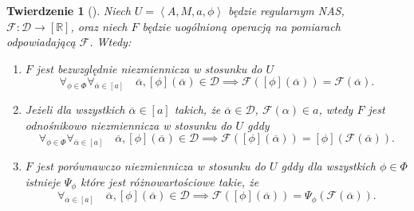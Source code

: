\documentclass[12pt,a4paper]{report}
\newtheorem{tw}[definition]{Twierdzenie}
\newcommand{\domkniecie}[1]{\left[ {#1} \right] }
\newcommand{\tuple}[1]{\left\langle {#1} \right\rangle}
\begin{document}
\begin{tw}[{\citep[Tw. 2]{adams1965theory}}]
Niech $U=\tuple{A,M,a,\phi}$ będzie regularnym NAS, $\mathcal{F}:\mathcal{D}\to \domkniecie{\mathbb{R}}$, oraz niech $F$ będzie uogólnioną operacją na pomiarach odpowiadającą $\mathcal{F}$. Wtedy:
\begin{enumerate}
\item
$F$ jest bezwzględnie niezmiennicza w stosunku do $U$ 
$$
\forall_{\phi \in \Phi} \forall_{\overline{\alpha} \in \domkniecie{a}} \quad \overline{\alpha}, \domkniecie{\phi}(\overline{\alpha}) \in \mathcal{D} \implies \mathcal{F}(\domkniecie{\phi}(\overline{\alpha}))=\mathcal{F}(\overline{\alpha}).
$$
\item
Jeżeli dla wszystkich $\overline{\alpha} \in \domkniecie{a}$ takich, że $\overline{\alpha} \in \mathcal{D}$, $\mathcal{F}(\alpha)\in a$, wtedy $F$ jest odnośnikowo niezmiennicza w stosunku do $U$ gddy
\begin{equation*}
\forall_{\phi \in \Phi} \forall_{\overline{\alpha} \in \domkniecie{a}} \quad \overline{\alpha}, \domkniecie{\phi}(\overline{\alpha}) \in \mathcal{D} \implies \mathcal{F}(\domkniecie{\phi}(\overline{\alpha}))=\domkniecie{\phi}(\mathcal{F}(\overline{\alpha})).
\end{equation*}
\item
$F$ jest porównawczo niezmiennicza w stosunku do $U$ gddy dla wszystkich $\phi \in \Phi$ istnieje $\Psi_{\phi}$ które jest różnowartościowe takie, że
$$
 \forall_{\overline{\alpha} \in \domkniecie{a}} \quad \overline{\alpha}, \domkniecie{\phi}(\overline{\alpha}) \in \mathcal{D} \implies \mathcal{F}(\domkniecie{\phi}(\overline{\alpha}))=\Psi_{\phi}(\mathcal{F}(\overline{\alpha})).
$$
\end{enumerate}
\end{tw}
\end{document}
